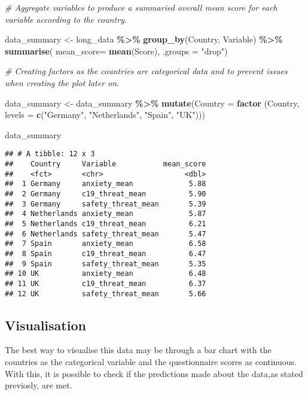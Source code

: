 \documentclass[
]{article}
\newenvironment{Shaded}{\begin{snugshade}}{\end{snugshade}}
\newcommand{\AttributeTok}[1]{\textcolor[rgb]{0.13,0.29,0.53}{#1}}
\newcommand{\CommentTok}[1]{\textcolor[rgb]{0.56,0.35,0.01}{\textit{#1}}}
\newcommand{\FunctionTok}[1]{\textcolor[rgb]{0.13,0.29,0.53}{\textbf{#1}}}
\newcommand{\NormalTok}[1]{#1}
\newcommand{\OtherTok}[1]{\textcolor[rgb]{0.56,0.35,0.01}{#1}}
\newcommand{\SpecialCharTok}[1]{\textcolor[rgb]{0.81,0.36,0.00}{\textbf{#1}}}
\newcommand{\StringTok}[1]{\textcolor[rgb]{0.31,0.60,0.02}{#1}}
\begin{document}
\begin{Shaded}
\begin{Highlighting}[]
\CommentTok{\# Aggregate variables to produce a summaried overall mean score for each variable according to the country. }

\NormalTok{data\_summary }\OtherTok{\textless{}{-}}\NormalTok{  long\_data }\SpecialCharTok{\%\textgreater{}\%}
  \FunctionTok{group\_by}\NormalTok{(Country, Variable) }\SpecialCharTok{\%\textgreater{}\%} 
  \FunctionTok{summarise}\NormalTok{( }\AttributeTok{mean\_score=} \FunctionTok{mean}\NormalTok{(Score), }\AttributeTok{.groups =} \StringTok{"drop"}\NormalTok{)}


\CommentTok{\# Creating factors as the countries are categorical data and to prevent issues when creating the plot later on. }

\NormalTok{data\_summary }\OtherTok{\textless{}{-}}\NormalTok{ data\_summary }\SpecialCharTok{\%\textgreater{}\%} 
  \FunctionTok{mutate}\NormalTok{(}\AttributeTok{Country =} \FunctionTok{factor}\NormalTok{ (Country, }\AttributeTok{levels =} \FunctionTok{c}\NormalTok{(}\StringTok{"Germany"}\NormalTok{, }\StringTok{"Netherlands"}\NormalTok{, }\StringTok{"Spain"}\NormalTok{, }\StringTok{"UK"}\NormalTok{)))}

\NormalTok{data\_summary}
\end{Highlighting}
\end{Shaded}

\begin{verbatim}
## # A tibble: 12 x 3
##    Country     Variable           mean_score
##    <fct>       <chr>                   <dbl>
##  1 Germany     anxiety_mean             5.88
##  2 Germany     c19_threat_mean          5.90
##  3 Germany     safety_threat_mean       5.39
##  4 Netherlands anxiety_mean             5.87
##  5 Netherlands c19_threat_mean          6.21
##  6 Netherlands safety_threat_mean       5.47
##  7 Spain       anxiety_mean             6.58
##  8 Spain       c19_threat_mean          6.47
##  9 Spain       safety_threat_mean       5.35
## 10 UK          anxiety_mean             6.48
## 11 UK          c19_threat_mean          6.37
## 12 UK          safety_threat_mean       5.66
\end{verbatim}

\subsection{Visualisation}\label{visualisation}

The best way to visualise this data may be through a bar chart with the
countries as the categorical variable and the questionnaire scores as
continuous. With this, it is possible to check if the predictions made
about the data,as stated previosly, are met.
\end{document}
